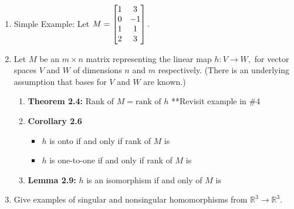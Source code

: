\documentclass[11pt,fleqn]{article}
\begin{document}
\begin{enumerate}
\item Simple Example: Let $M=\begin{bmatrix} 1&3 \\ 0&-1 \\ 1&1 \\ 2&3 \end{bmatrix}.$ 
\vfill
\newpage
\item Let $M$ be an $m \times n$ matrix representing the linear map $h: V \to W,$ for vector spaces $V$ and $W$ of dimensions $n$ and $m$ respectively. (There is an underlying assumption that bases for $V$ and $W$ are known.)
	\begin{enumerate}
	\item \textbf{Theorem 2.4:} Rank of $M = \text{rank of } h$
	\vfill
	**Revisit example in \#4\\
	\item \textbf{Corollary 2.6} 
	\begin{itemize}
	\item $h$ is onto if and only if rank of $M$ is\\
	\item $h$ is one-to-one if and only if rank of $M$ is\\
	\end{itemize}
	\vspace{1in}
	\item \textbf{Lemma 2.9:} $h$ is an isomorphism if and only of $M$ is  \\
	\vfill
	\end{enumerate}
\item Give examples of singular and nonsingular homomorphisms from $\mathbb{R}^3 \to \mathbb{R}^3.$
\vfill


\end{enumerate}
\end{document}
